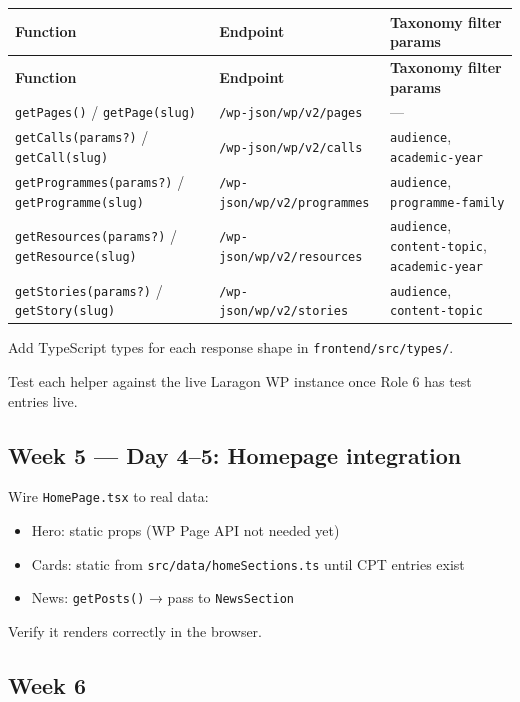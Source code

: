 \documentclass[11pt,a4paper]{article}
\begin{document}
\begin{longtable}{@{}p{3.2cm}p{6.0cm}p{5.0cm}@{}}
\rowcolor{uvtLightBlue}
\textbf{Function} & \textbf{Endpoint} & \textbf{Taxonomy filter params} \\
\midrule
\endfirsthead
\rowcolor{uvtLightBlue}
\textbf{Function} & \textbf{Endpoint} & \textbf{Taxonomy filter params} \\
\midrule
\endhead
\nolinkurl{getPages()} / \nolinkurl{getPage(slug)} & \nolinkurl{/wp-json/wp/v2/pages} & — \\
\nolinkurl{getCalls(params?)} / \nolinkurl{getCall(slug)} & \nolinkurl{/wp-json/wp/v2/calls} & \nolinkurl{audience}, \nolinkurl{academic-year} \\
\nolinkurl{getProgrammes(params?)} / \nolinkurl{getProgramme(slug)} & \nolinkurl{/wp-json/wp/v2/programmes} & \nolinkurl{audience}, \nolinkurl{programme-family} \\
\nolinkurl{getResources(params?)} / \nolinkurl{getResource(slug)} & \nolinkurl{/wp-json/wp/v2/resources} & \nolinkurl{audience}, \nolinkurl{content-topic}, \nolinkurl{academic-year} \\
\nolinkurl{getStories(params?)} / \nolinkurl{getStory(slug)} & \nolinkurl{/wp-json/wp/v2/stories} & \nolinkurl{audience}, \nolinkurl{content-topic} \\
\end{longtable}

Add TypeScript types for each response shape in \nolinkurl{frontend/src/types/}.

Test each helper against the live Laragon WP instance once Role 6 has test entries live.

\subsection{Week 5 — Day 4–5: Homepage integration}

Wire \nolinkurl{HomePage.tsx} to real data:
\begin{itemize}
\item Hero: static props (WP Page API not needed yet)
\item Cards: static from \nolinkurl{src/data/homeSections.ts} until CPT entries exist
\item News: \nolinkurl{getPosts()} → pass to \nolinkurl{NewsSection}
\end{itemize}

Verify it renders correctly in the browser.

\subsection{Week 6}
\end{document}
